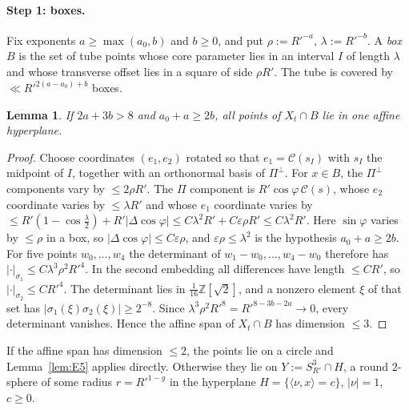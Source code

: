 \documentclass[aps,prx,twocolumn,superscriptaddress,nofootinbib,longbibliography]{revtex4-2}
\theoremstyle{plain}
\newtheorem{lemma}{Lemma}
\theoremstyle{definition}
\theoremstyle{remark}
\newcommand{\Z}{\mathbb{Z}}
\begin{document}
\paragraph{Step 1: boxes.} Fix exponents $a\ge\max(a_0,b)$ and $b\ge0$, and put $\rho:=R'^{-a}$, $\lambda:=R'^{-b}$. A \emph{box} $B$ is the set of tube points whose core parameter lies in an interval $I$ of length $\lambda$ and whose transverse offset lies in a square of side $\rho R'$. The tube is covered by $\ll R'^{2(a-a_0)+b}$ boxes.

\begin{lemma}\label{lem:E1}
If $2a+3b>8$ and $a_0+a\ge2b$, all points of $X_t\cap B$ lie in one affine hyperplane.
\end{lemma}
\begin{proof}
Choose coordinates $(e_1,e_2)$ rotated so that $e_1=\mathcal C(s_I)$ with $s_I$ the midpoint of $I$, together with an orthonormal basis of $\Pi^\perp$. For $x\in B$, the $\Pi^\perp$ components vary by $\le2\rho R'$. The $\Pi$ component is $R'\cos\varphi\,\mathcal C(s)$, whose $e_2$ coordinate varies by $\le\lambda R'$ and whose $e_1$ coordinate varies by $\le R'(1-\cos\tfrac\lambda2)+R'|\Delta\cos\varphi|\le C\lambda^2R'+C\varepsilon\rho R'\le C\lambda^2R'$. Here $\sin\varphi$ varies by $\le\rho$ in a box, so $|\Delta\cos\varphi|\le C\varepsilon\rho$, and $\varepsilon\rho\le\lambda^2$ is the hypothesis $a_0+a\ge2b$. For five points $w_0,\dots,w_4$ the determinant of $w_1-w_0,\dots,w_4-w_0$ therefore has $|\cdot|_{\sigma_1}\le C\lambda^3\rho^2R'^4$. In the second embedding all differences have length $\le CR'$, so $|\cdot|_{\sigma_2}\le CR'^4$. The determinant lies in $\tfrac1{16}\Z[\sqrt2]$, and a nonzero element $\xi$ of that set has $|\sigma_1(\xi)\sigma_2(\xi)|\ge2^{-8}$. Since $\lambda^3\rho^2R'^8=R'^{8-3b-2a}\to0$, every determinant vanishes. Hence the affine span of $X_t\cap B$ has dimension $\le3$.
\end{proof}

If the affine span has dimension $\le2$, the points lie on a circle and Lemma~\ref{lem:E5} applies directly. Otherwise they lie on $Y:=S^3_{R'}\cap H$, a round $2$-sphere of some radius $r=R'^{1-g}$ in the hyperplane $H=\{\langle\nu,x\rangle=c\}$, $|\nu|=1$, $c\ge0$.
\end{document}
